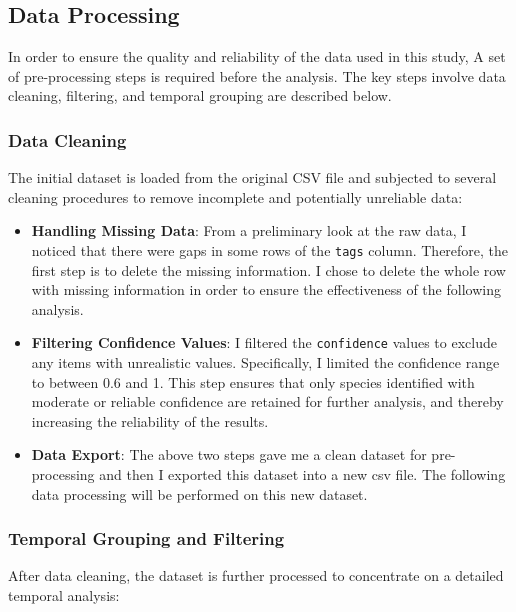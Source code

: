 \documentclass[a4paper,12pt]{article}
\begin{document}
\subsection{Data Processing}

In order to ensure the quality and reliability of the data used in this study, A set of pre-processing steps is required before the analysis. The key steps involve data cleaning, filtering, and temporal grouping are described below.

\subsubsection{Data Cleaning}

The initial dataset is loaded from the original CSV file and subjected to several cleaning procedures to remove incomplete and potentially unreliable data:

\begin{itemize}
    \item \textbf{Handling Missing Data}: From a preliminary look at the raw data, I noticed that there were gaps in some rows of the \texttt{tags} column. Therefore, the first step is to delete the missing information. I chose to delete the whole row with missing information in order to ensure the effectiveness of the following analysis.
    
    \item \textbf{Filtering Confidence Values}: I filtered the \texttt{confidence} values to exclude any items with unrealistic values. Specifically, I limited the confidence range to between 0.6 and 1. This step ensures that only species identified with moderate or reliable confidence are retained for further analysis, and thereby increasing the reliability of the results.
    
    \item \textbf{Data Export}: The above two steps gave me a clean dataset for pre-processing and then I exported this dataset into a new csv file. The following data processing will be performed on this new dataset.
\end{itemize}

\subsubsection{Temporal Grouping and Filtering}

After data cleaning, the dataset is further processed to concentrate on a detailed temporal analysis:
\end{document}
